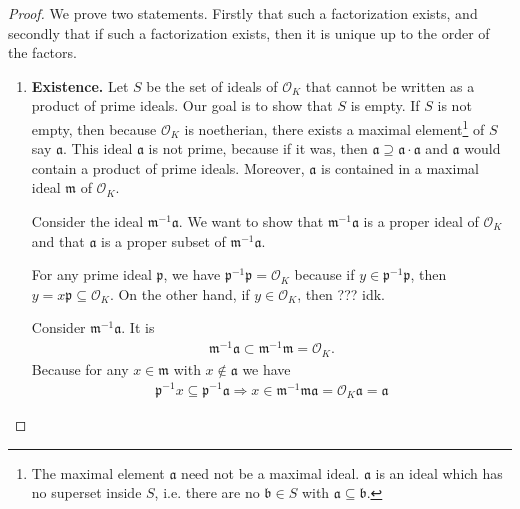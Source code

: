 \begin{proof}
    We prove two statements. Firstly that such a factorization exists, and secondly that if such a factorization exists, then it is unique up to the order of the factors.
    \begin{enumerate}
        \item \textbf{Existence.} Let \(S\) be the set of ideals of \(\mathcal{O}_K\) that cannot be written as a product of prime ideals. Our goal is to show that \(S\) is empty. If \(S\) is not empty, then because \(\mathcal{O}_K\) is noetherian, there exists a maximal element\footnote{The maximal element \(\mathfrak{a}\) need not be a maximal ideal. \(\mathfrak{a}\) is an ideal which has no superset inside \(S\), i.e. there are no \(\mathfrak{b} \in S\) with \(\mathfrak{a} \subseteq \mathfrak{b}\).} of \(S\) say \(\mathfrak{a}\). This ideal \(\mathfrak{a}\) is not prime, because if it was, then \(\mathfrak{a} \supseteq \mathfrak{a} \cdot \mathfrak{a}\) and \(\mathfrak{a}\) would contain a product of prime ideals. Moreover, \(\mathfrak{a}\) is contained in a maximal ideal \(\mathfrak{m}\) of \(\mathcal{O}_K\).
        
        Consider the ideal \(\mathfrak{m}^{-1} \mathfrak{a}\). We want to show that \(\mathfrak{m}^{-1} \mathfrak{a}\) is a proper ideal of \(\mathcal{O}_K\) and that \(\mathfrak{a}\) is a proper subset of \(\mathfrak{m}^{-1} \mathfrak{a}\).
        
        For any prime ideal \(\mathfrak{p}\), we have \(\mathfrak{p}^{-1} \mathfrak{p} = \mathcal{O}_K\) because if \(y \in \mathfrak{p}^{-1} \mathfrak{p}\), then \(y = x \mathfrak{p} \subseteq \mathcal{O}_K\). On the other hand, if \(y \in \mathcal{O}_K\), then ??? idk. 

        Consider \(\mathfrak{m}^{-1} \mathfrak{a}\). It is
        \begin{align*}
            \mathfrak{m}^{-1} \mathfrak{a} \subset \mathfrak{m}^{-1} \mathfrak{m} = \mathcal{O}_K \text{.}
        \end{align*}
        Because for any \(x \in \mathfrak{m}\) with \(x \not\in \mathfrak{a}\) we have
        \begin{align*}
            \mathfrak{p}^{-1} x \subseteq \mathfrak{p}^{-1} \mathfrak{a} \Rightarrow x \in \mathfrak{m}^{-1} \mathfrak{m} \mathfrak{a} = \mathcal{O}_K \mathfrak{a} = \mathfrak{a}
        \end{align*}
    \end{enumerate}
\end{proof}

